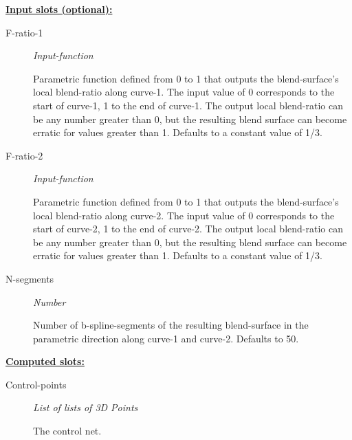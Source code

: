 \documentclass [11pt]{book}
\begin{document}
\begin{itemize}
\begin{description}
\end{description}






\textbf{
\underline{Input slots (optional):}}

\begin{description}

\item [F-ratio-1]
\emph{Input-function}

 Parametric function defined from 0 to 1 that outputs the blend-surface's local blend-ratio along curve-1. The input value of 0 corresponds to the start of curve-1, 1 to the end of curve-1. The output local blend-ratio can be any number greater than 0, but the resulting blend surface can become erratic for values greater than 1. Defaults to a constant value of 1/3.




\item [F-ratio-2]
\emph{Input-function}

 Parametric function defined from 0 to 1 that outputs the blend-surface's local blend-ratio along curve-2. The input value of 0 corresponds to the start of curve-2, 1 to the end of curve-2. The output local blend-ratio can be any number greater than 0, but the resulting blend surface can become erratic for values greater than 1. Defaults to a constant value of 1/3.




\item [N-segments]
\emph{Number}

 Number of b-spline-segments of the resulting blend-surface in the parametric direction along curve-1 and curve-2. Defaults to 50.




\end{description}






\textbf{
\underline{Computed slots:}}

\begin{description}

\item [Control-points]
\emph{List of lists of 3D Points}

 The control net.





\end{description}
\end{itemize}
\end{document}

